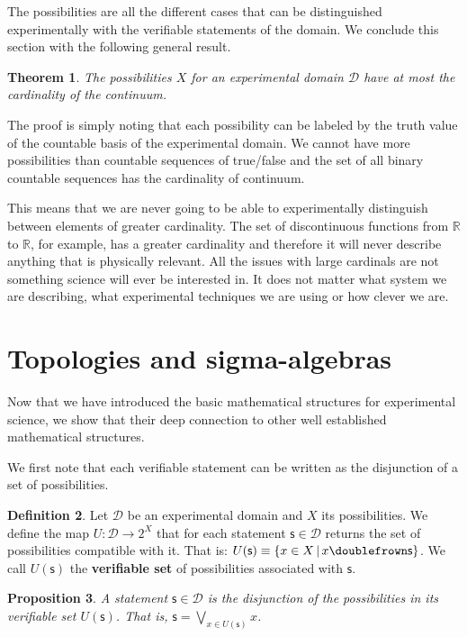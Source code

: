 \documentclass[letterpaper]{article}
\theoremstyle{plain}%
\newtheorem{thrm}{Theorem}[section]
\newtheorem{prop}[thrm]{Proposition}
\theoremstyle{definition}
\newtheorem{defn}[thrm]{Definition}
\theoremstyle{remark}
\def\comp{\doublefrown}
\def\bigOR{\bigvee}
\newcommand{\obs}[1][s] {\mathsf{#1}}
\newcommand{\edomain}[1][D] {\mathcal{#1}}
\begin{document}
The possibilities are all the different cases that can be distinguished experimentally with the verifiable statements of the domain. We conclude this section with the following general result.

\begin{thrm}
	The possibilities $X$ for an experimental domain $\edomain$ have at most the cardinality of the continuum.
\end{thrm}

The proof is simply noting that each possibility can be labeled by the truth value of the countable basis of the experimental domain. We cannot have more possibilities than countable sequences of true/false and the set of all binary countable sequences has the cardinality of continuum.

This means that we are never going to be able to experimentally distinguish between elements of greater cardinality. The set of discontinuous functions from $\mathbb{R}$ to $\mathbb{R}$, for example, has a greater cardinality and therefore it will never describe anything that is physically relevant. All the issues with large cardinals are not something science will ever be interested in. It does not matter what system we are describing, what experimental techniques we are using or how clever we are.

\section{Topologies and sigma-algebras}

Now that we have introduced the basic mathematical structures for experimental science, we show that their deep connection to other well established mathematical structures.

We first note that each verifiable statement can be written as the disjunction of a set of possibilities.

\begin{defn}
	Let $\edomain$ be an experimental domain and $X$ its possibilities. We define the map $U : \edomain \rightarrow 2^X$ that for each statement $\obs \in \edomain$ returns the set of possibilities compatible with it. That is: $U(\obs)\equiv\{ x \in X \, | \, x \comp \obs\}$. We call $U(\obs)$ the \textbf{verifiable set} of possibilities associated with $\obs$.
\end{defn}

\begin{prop}
	A statement $\obs \in \edomain$ is the disjunction of the possibilities in its verifiable set $U(\obs)$. That is, $\obs=\bigOR\limits_{x \in U(\obs)} x$.
\end{prop}
\end{document}
